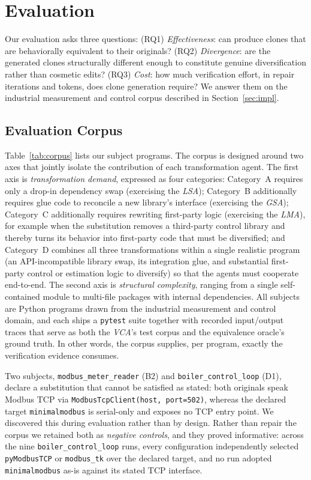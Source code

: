 \section{Evaluation}
\label{sec:results}

Our evaluation asks three questions: (RQ1) \emph{Effectiveness}: can \sys produce clones that are behaviorally equivalent to their originals? (RQ2) \emph{Divergence}: are the generated clones structurally different enough to constitute genuine diversification rather than cosmetic edits? (RQ3) \emph{Cost}: how much verification effort, in repair iterations and tokens, does clone generation require? We answer them on the industrial measurement and control corpus described in Section~\ref{sec:impl}.

\subsection{Evaluation Corpus}

Table~\ref{tab:corpus} lists our subject programs. The corpus is designed around two axes that jointly isolate the contribution of each transformation agent. The first axis is \emph{transformation demand}, expressed as four categories: Category~A requires only a drop-in dependency swap (exercising the \emph{LSA}); Category~B additionally requires glue code to reconcile a new library's interface (exercising the \emph{GSA}); Category~C additionally requires rewriting first-party logic (exercising the \emph{LMA}), for example when the substitution removes a third-party control library and thereby turns its behavior into first-party code that must be diversified; and Category~D combines all three transformations within a single realistic program (an API-incompatible library swap, its integration glue, and substantial first-party control or estimation logic to diversify) so that the agents must cooperate end-to-end. The second axis is \emph{structural complexity}, ranging from a single self-contained module to multi-file packages with internal dependencies. All subjects are Python programs drawn from the industrial measurement and control domain, and each ships a \texttt{pytest} suite together with recorded input/output traces that serve as both the \emph{VCA}'s test corpus and the equivalence oracle's ground truth. In other words, the corpus supplies, per program, exactly the verification evidence \sys consumes.

Two subjects, \texttt{modbus\_meter\_reader} (B2) and \texttt{boiler\_control\_loop} (D1), declare a substitution that cannot be satisfied as stated: both originals speak Modbus TCP via \texttt{ModbusTcpClient(host, port=502)}, whereas the declared target \texttt{minimalmodbus} is serial-only and exposes no TCP entry point. We discovered this during evaluation rather than by design. Rather than repair the corpus we retained both as \emph{negative controls}, and they proved informative: across the nine \texttt{boiler\_control\_loop} runs, every \sys configuration independently selected \texttt{pyModbusTCP} or \texttt{modbus\_tk} over the declared target, and no run adopted \texttt{minimalmodbus} as-is against its stated TCP interface.

